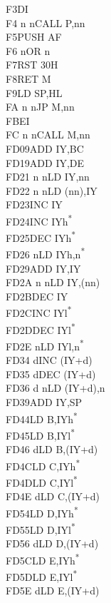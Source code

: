 \documentclass[twoside,openright,a4paper]{book}
\begin{document}
\begin{multicols}{3}
{\begin{tabbing}
	F3\>DI\\
	F4 n n\>CALL P,nn\\
	F5\>PUSH AF\\
	F6 n\>OR n\\
	F7\>RST 30H\\
	F8\>RET M\\
	F9\>LD SP,HL\\
	FA n n\>JP M,nn\\
	FB\>EI\\
	FC n n\>CALL M,nn\\
	FD09\>ADD IY,BC\\
	FD19\>ADD IY,DE\\
	FD21 n n\>LD IY,nn\\
	FD22 n n\>LD (nn),IY\\
	FD23\>INC IY\\
	FD24\>INC IYh\textsuperscript{*}\\
	FD25\>DEC IYh\textsuperscript{*}\\
	FD26 n\>LD IYh,n\textsuperscript{*}\\
	FD29\>ADD IY,IY\\
	FD2A n n\>LD IY,(nn)\\
	FD2B\>DEC IY\\
	FD2C\>INC IYl\textsuperscript{*}\\
	FD2D\>DEC IYl\textsuperscript{*}\\
	FD2E n\>LD IYl,n\textsuperscript{*}\\
	FD34 d\>INC (IY+d)\\
	FD35 d\>DEC (IY+d)\\
	FD36 d n\>LD (IY+d),n\\
	FD39\>ADD IY,SP\\
	FD44\>LD B,IYh\textsuperscript{*}\\
	FD45\>LD B,IYl\textsuperscript{*}\\
	FD46 d\>LD B,(IY+d)\\
	FD4C\>LD C,IYh\textsuperscript{*}\\
	FD4D\>LD C,IYl\textsuperscript{*}\\
	FD4E d\>LD C,(IY+d)\\
	FD54\>LD D,IYh\textsuperscript{*}\\
	FD55\>LD D,IYl\textsuperscript{*}\\
	FD56 d\>LD D,(IY+d)\\
	FD5C\>LD E,IYh\textsuperscript{*}\\
	FD5D\>LD E,IYl\textsuperscript{*}\\
	FD5E d\>LD E,(IY+d)\\

\end{tabbing}}
\end{multicols}
\end{document}
